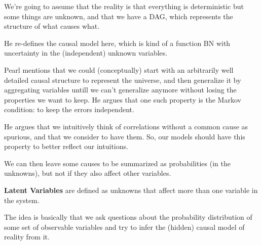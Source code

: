 We're going to assume that the reality is that everything is deterministic but some things are unknown, and that we have a DAG, which represents the structure of what causes what.

He re-defines the causal model here, which is kind of a function BN with uncertainty in the (independent) unknown variables.

Pearl mentions that we could (conceptually) start with an arbitrarily well detailed causal structure to represent the universe, and then generalize it by aggregating variables untill we can't generalize anymore without losing the properties we want to keep. He argues that one such property is the Markov condition: to keep the errors independent. 

He argues that we intuitively think of correlations without a common cause as spurious, and that we consider  to have them. So, our models should have this property to better reflect our intuitions.

We can then leave some causes to be summarized as probabilities (in the unknowns), but not if they also affect other variables.

\textbf{Latent Variables} are defined as unknowns that affect more than one variable in the system.

The idea is basically that we ask questions about the probability distribution of some set of observable variables and try to infer the (hidden) causal model of reality from it.


